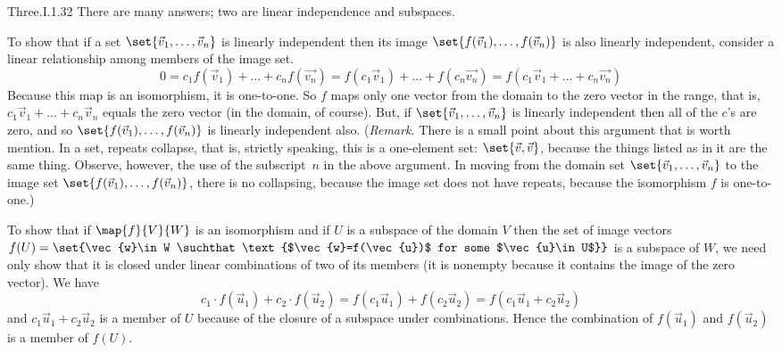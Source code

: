 \begin{ans}{Three.I.1.32}
       There are many answers; two are linear independence and
       subspaces.

       To show that if a set $\set{\vec{v}_1,\dots,\vec{v}_n}$ is linearly
       independent then its image $\set{f(\vec{v}_1),\dots,f(\vec{v}_n)}$
       is also linearly independent, consider a linear relationship
       among members of the image set.
       \begin{equation*}
         0=c_1f(\vec{v}_1)+\dots+c_nf(\vec{v_n})
          =f(c_1\vec{v}_1)+\dots+f(c_n\vec{v_n})
          =f(c_1\vec{v}_1+\dots+c_n\vec{v_n})
       \end{equation*}
       Because this map is an isomorphism, it is one-to-one.
       So $f$ maps only one vector from the domain to the zero vector in the
       range, that is, $c_1\vec{v}_1+\dots+c_n\vec{v}_n$ equals the
       zero vector (in the domain, of course).
       But, if $\set{\vec{v}_1,\dots,\vec{v}_n}$ is linearly
       independent then all of the $c$'s are zero, and so
       $\set{f(\vec{v}_1),\dots,f(\vec{v}_n)}$ is linearly independent also.
       (\textit{Remark.}
       There is a small point about this argument that is worth mention.
       In a set, repeats collapse, that is, strictly speaking, this is a
       one-element set: $\set{\vec{v},\vec{v}}$, because the things
       listed as in it are the same thing.
       Observe, however, the use of the subscript~$n$ in the above argument.
       In moving from the domain set $\set{\vec{v}_1,\dots,\vec{v}_n}$ to
       the image set
       $\set{f(\vec{v}_1),\dots,f(\vec{v}_n)}$, there is no collapsing,
       because the image set does not have repeats,
       because the isomorphism $f$ is one-to-one.)

       To show that if $\map{f}{V}{W}$ is an isomorphism and if
       $U$ is a subspace of the domain $V$ then the set of image vectors
       $f(U)=\set{\vec{w}\in W
                 \suchthat\text{$\vec{w}=f(\vec{u})$ for some $\vec{u}\in U$}}$
       is a subspace of $W$, we need only show that it is closed under linear
       combinations of two of its members (it is nonempty because it contains
       the image of the zero vector).
       We have
       \begin{equation*}
         c_1\cdot f(\vec{u}_1)+c_2\cdot f(\vec{u}_2)
        =f(c_1\vec{u}_1)+f(c_2\vec{u}_2)
        =f(c_1\vec{u}_1+c_2\vec{u}_2)
       \end{equation*}
       and $c_1\vec{u}_1+c_2\vec{u}_2$ is a member of $U$ because of
       the closure of a subspace under combinations.
       Hence the combination of $f(\vec{u}_1)$ and $f(\vec{u}_2)$ is
       a member of $f(U)$.
      
\end{ans}

